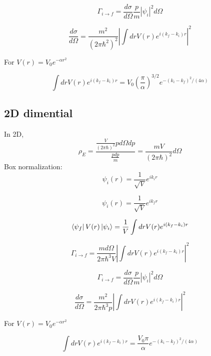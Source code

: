 \documentclass[12pt,twoside]{article}
\begin{document}
$$
\Gamma_{i\rightarrow f} = \frac{d\sigma}{d\Omega} \frac{p}{m} |\psi_i|^2 d\Omega
$$

$$
\frac{d\sigma}{d\Omega} = \frac{m^2}{(2\pi \hbar^2)^2} |\int dr V(r) e^{i(k_f - k_i) r}|^2
$$

For $V(r) = V_0 e^{-\alpha r^2}$

$$
\int dr V(r) e^{i(k_f - k_i) r} = V_0 (\frac{\pi}{\alpha})^{3/2} e^{-(k_i - k_f)^2/(4\alpha)}
$$


\subsection{2D dimential}

In 2D,
$$
\rho_E = \frac{
\frac{V}{(2\pi\hbar)^2}{ p d\Omega dp}
}{
\frac{p dp}{m}
}
=
\frac{m V}{(2\pi\hbar)^2}{d\Omega}
$$
Box normalization:
$$
\psi_i(r) = \frac{1}{\sqrt{V}} e^{i k_i r}
$$

$$
\psi_i(r) = \frac{1}{\sqrt{V}} e^{i k_f r}
$$

$$
\bra{\psi_f} V(r) \ket{\psi_i} =  \frac{1}{V} \int dr V(r) e^{i(k_f - k_i) r}
$$

$$
\Gamma_{i\rightarrow f} = \frac{m d\Omega}{2\pi \hbar^3 V} |\int dr V(r) e^{i(k_f - k_i) r}|^2
$$

$$
\Gamma_{i\rightarrow f} = \frac{d\sigma}{d\Omega} \frac{p}{m} |\psi_i|^2 d\Omega
$$

$$
\frac{d\sigma}{d\Omega} = \frac{m^2}{2\pi \hbar^3 p} |\int dr V(r) e^{i(k_f - k_i) r}|^2
$$

For $V(r) = V_0 e^{-\alpha r^2}$

$$
\int dr V(r) e^{i(k_f - k_i) r} = \frac{V_0 \pi}{\alpha} e^{-(k_i - k_f)^2/(4\alpha)}
$$
\end{document}
